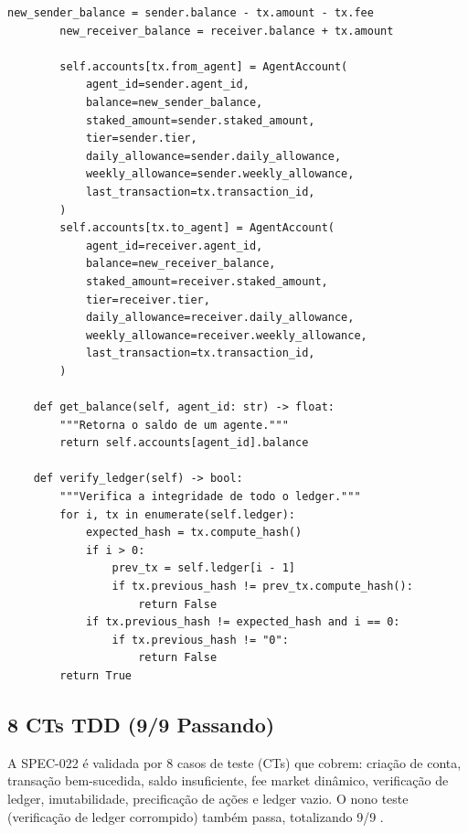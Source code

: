 \begin{lstlisting}[caption={Motor de transacoes da Token Economy},label={lst:token-engine}]
        new_sender_balance = sender.balance - tx.amount - tx.fee
        new_receiver_balance = receiver.balance + tx.amount

        self.accounts[tx.from_agent] = AgentAccount(
            agent_id=sender.agent_id,
            balance=new_sender_balance,
            staked_amount=sender.staked_amount,
            tier=sender.tier,
            daily_allowance=sender.daily_allowance,
            weekly_allowance=sender.weekly_allowance,
            last_transaction=tx.transaction_id,
        )
        self.accounts[tx.to_agent] = AgentAccount(
            agent_id=receiver.agent_id,
            balance=new_receiver_balance,
            staked_amount=receiver.staked_amount,
            tier=receiver.tier,
            daily_allowance=receiver.daily_allowance,
            weekly_allowance=receiver.weekly_allowance,
            last_transaction=tx.transaction_id,
        )

    def get_balance(self, agent_id: str) -> float:
        """Retorna o saldo de um agente."""
        return self.accounts[agent_id].balance

    def verify_ledger(self) -> bool:
        """Verifica a integridade de todo o ledger."""
        for i, tx in enumerate(self.ledger):
            expected_hash = tx.compute_hash()
            if i > 0:
                prev_tx = self.ledger[i - 1]
                if tx.previous_hash != prev_tx.compute_hash():
                    return False
            if tx.previous_hash != expected_hash and i == 0:
                if tx.previous_hash != "0":
                    return False
        return True
\end{lstlisting}

\subsection{8 CTs TDD (9/9 Passando)}

A SPEC-022 é validada por 8 casos de teste (CTs) que cobrem:
criação de conta, transação bem-sucedida, saldo insuficiente,
fee market dinâmico, verificação de ledger, imutabilidade,
precificação de ações e ledger vazio. O nono teste (verificação
de ledger corrompido) também passa, totalizando 9/9
\cite{opencode2026token}.


